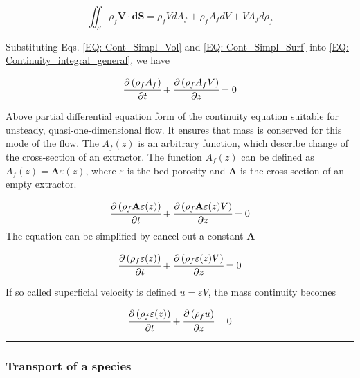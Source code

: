 \documentclass[../Article_Model_Parameters.tex]{subfiles}
\begin{document}
	{\footnotesize
		\begin{equation}
			\iint_S \rho_f \textbf{V} \cdot \textbf{dS} = \rho_f V dA_f + \rho_f A_f dV + V A_f d\rho_f 
			\label{EQ: Cont_Simpl_Surf}
		\end{equation}
	}

	Substituting Eqs. \ref{EQ: Cont_Simpl_Vol} and \ref{EQ: Cont_Simpl_Surf} into \ref{EQ: Continuity_integral_general}, we have
	
	{\footnotesize
		\begin{equation}
			\cfrac{\partial \left( \rho_f A_f \right)}{\partial t} + \cfrac{\partial \left( \rho_f A_f V \right)}{\partial z} = 0
			\label{EQ: Conservative_continuity}
		\end{equation}
	}
	
	Above partial differential equation form of the continuity equation suitable for unsteady, quasi-one-dimensional flow. It ensures that mass is conserved for this mode of the flow. The $A_f(z)$ is an arbitrary function, which describe change of the cross-section of an extractor. The function $A_f(z)$ can be defined as $A_f(z) = \textbf{A} \varepsilon(z)$, where $\varepsilon$ is the bed porosity and $\textbf{A}$ is the cross-section of an empty extractor.
	
	{\footnotesize
		\begin{equation}
			\cfrac{\partial \left( \rho_f \textbf{A} \varepsilon (z) \right)}{\partial t} + \cfrac{\partial \left( \rho_f \textbf{A} \varepsilon (z) V \right)}{\partial z} = 0
		\end{equation}
	}
	The equation can be simplified by cancel out a constant $\textbf{A}$
	
	{\footnotesize
		\begin{equation}
			\cfrac{\partial \left( \rho_f \varepsilon (z) \right)}{\partial t} + \cfrac{\partial \left( \rho_f \varepsilon (z) V \right)}{\partial z} = 0
		\end{equation}
	}
	
	If so called superficial velocity is defined $u=\varepsilon V$, the mass continuity becomes
	
	{\footnotesize
		\begin{equation}
			\cfrac{\partial \left( \rho_f \varepsilon (z) \right)}{\partial t} + \cfrac{\partial \left( \rho_f u \right)}{\partial z} = 0
			\label{EQ: Mass_Continuity}
		\end{equation}
	}
	
	\hrule
	
	\subsubsection{Transport of a species}
	
\end{document}
